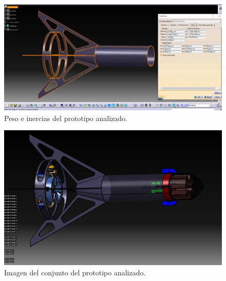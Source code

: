 \begin{figure}[htb]
    \centering
    \includegraphics[height=0.25\pdfpageheight]{fig/fea/inerciaspatas.png}
    \caption{Peso e inercias del prototipo analizado.}
    \label{fig:fea/patas4}
\end{figure}

\begin{figure}[htb]
    \centering
    \includegraphics[height=0.3\pdfpageheight]{fig/fea/imagenpatas.png}
    \caption{Imagen del conjunto del prototipo analizado.}
    \label{fig:fea/imagenpatas}
\end{figure}

